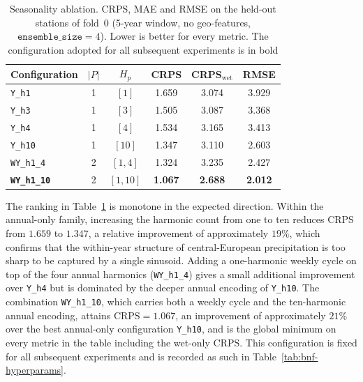 \begin{table}[ht]
  \centering
  \caption[Seasonality ablation on fold~0]{Seasonality ablation. CRPS,
  MAE and RMSE on the held-out stations of fold~0 (5-year window, no
  geo-features, $\texttt{ensemble\_size}=4$). Lower is better for every
  metric. The configuration adopted for all subsequent experiments is
  in bold}
  \label{tab:bnf-seasonality}
  \begin{tabular}{l c c c c c}
    \toprule
    Configuration         & $|P|$ & $H_p$
                          & CRPS  & CRPS$_{\mathrm{wet}}$
                          & RMSE                            \\
    \midrule
    \texttt{Y\_h1}        & 1 & $[1]$
                          & 1.659 & 3.074 & 3.929           \\
    \texttt{Y\_h3}        & 1 & $[3]$
                          & 1.505 & 3.087 & 3.368           \\
    \texttt{Y\_h4}        & 1 & $[4]$
                          & 1.534 & 3.165 & 3.413           \\
    \texttt{Y\_h10}       & 1 & $[10]$
                          & 1.347 & 3.110 & 2.603           \\
    \texttt{WY\_h1\_4}    & 2 & $[1, 4]$
                          & 1.324 & 3.235 & 2.427           \\
    \textbf{\texttt{WY\_h1\_10}} & 2 & $[1, 10]$
                          & \textbf{1.067} & \textbf{2.688} & \textbf{2.012} \\
    \bottomrule
  \end{tabular}
\end{table}

The ranking in Table~\ref{tab:bnf-seasonality} is monotone in the
expected direction. Within the annual-only family, increasing the
harmonic count from one to ten reduces CRPS from $1.659$ to $1.347$,
a relative improvement of approximately $19\%$, which confirms that
the within-year structure of central-European precipitation is too
sharp to be captured by a single sinusoid. Adding a one-harmonic
weekly cycle on top of the four annual harmonics
(\texttt{WY\_h1\_4}) gives a small additional improvement over
\texttt{Y\_h4} but is dominated by the deeper annual encoding of
\texttt{Y\_h10}. The combination \texttt{WY\_h1\_10}, which carries
both a weekly cycle and the ten-harmonic annual encoding, attains
$\mathrm{CRPS} = 1.067$, an improvement of approximately $21\%$ over
the best annual-only configuration \texttt{Y\_h10}, and is the global
minimum on every metric in the table including the wet-only CRPS.
This configuration is fixed for all subsequent experiments and is
recorded as such in Table~\ref{tab:bnf-hyperparams}.

